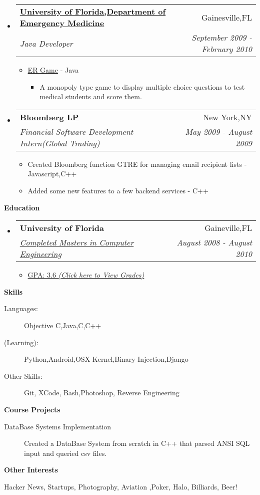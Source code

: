 \documentclass[letterpaper,11pt]{article}
\makeatletter
\newcommand{\resitem}[1]{\item #1 \vspace{-2pt}}
\newcommand{\resheading}[1]{{\large \colorbox{mygrey}{\begin{minipage}{\textwidth}{\textbf{#1 \vphantom{p\^{E}}}}\end{minipage}}}}
\newcommand{\ressubheading}[4]{
\begin{tabular*}{7.0in}{l@{\extracolsep{\fill}}r}
		\textbf{#1} & #2 \\
		\textit{#3} & \textit{#4} \\
\end{tabular*}\vspace{-6pt}}
\makeatother
\begin{document}
\begin{itemize}
\item
    \ressubheading{\href{http://emergency.med.ufl.edu}{University of Florida,Department of Emergency Medicine}}{Gainesville,FL}{Java Developer}{September 2009 - February 2010}
    \begin{itemize}
        \resitem{\href{http://onlinelibrary.wiley.com/doi/10.1111/j.1553-2712.2009.00392_16.x/abstract}{ER Game} - Java}
        \begin{itemize}
            \resitem{A monopoly type game to display multiple choice questions to test medical students and score them.}
        \end{itemize}
    \end{itemize}
                
\item
    \ressubheading{\href{http://www.bloomberg.com}{Bloomberg LP}}{New York,NY}{Financial Software Development Intern(Global Trading)}{May 2009 - August 2009}
    \begin{itemize}
        \resitem{Created Bloomberg function GTRE for managing email recipient lists - Javascript,C++}
        \resitem{Added some new features to a few backend services - C++ }
    \end{itemize}
\end{itemize}

	
\resheading{Education}
\begin{itemize}
\item
    \ressubheading{University of Florida}{Gaineville,FL}{\href{http://dl.dropbox.com/u/23360122/UF_Grades.pdf}{Completed Masters in Computer Engineering}}{August 2008 - August 2010}
    \begin{itemize}
        \resitem{\href{http://dl.dropbox.com/u/23360122/UF_Grades.pdf}{GPA: 3.6 \emph{(Click here to View Grades)}}}
    \end{itemize}
\end{itemize}

\resheading{Skills}
\begin{description}
\item[Languages:]
Objective C,Java,C,C++
\item[(Learning):]
Python,Android,OSX Kernel,Binary Injection,Django
\item[Other Skills:]
Git, XCode, Bash,Photoshop, Reverse Engineering 
\end{description}

\resheading{Course Projects}
\begin{description}
\item[DataBase Systems Implementation] Created a DataBase System from scratch in C++ that parsed ANSI SQL input and queried csv files.
\end{description}


\resheading{Other Interests}
\begin{description}
\item Hacker News, Startups, Photography, Aviation ,Poker, Halo, Billiards, Beer!
\end{description}
\end{document}
